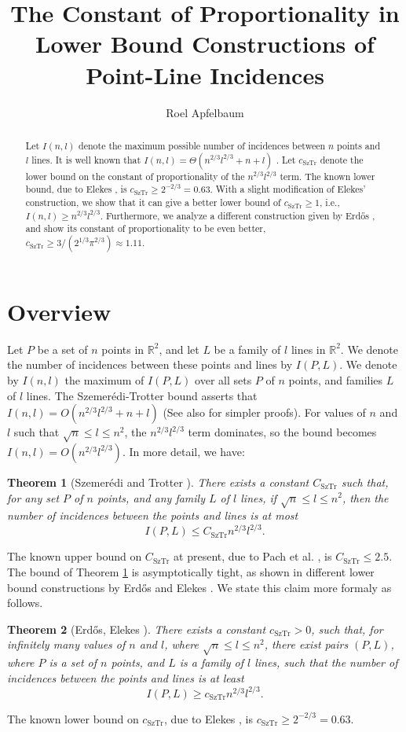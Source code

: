 \documentclass[11pt]{article}
\def\R{{\mathbb R}}
\newtheorem{theorem}{Theorem}[section]
\newcommand\erdos{{Erd{\H o}s}\xspace}
\newcommand\szemeredi{{Szemer\'edi}\xspace}
\newcommand\Cst{C_{\mathrm{SzTr}}}
\newcommand\cst{c_{\mathrm{SzTr}}}
\begin{document}
\title{The Constant of Proportionality in Lower Bound Constructions of
Point-Line Incidences}
\author{Roel Apfelbaum}

\maketitle

\begin{abstract}
Let $I(n,l)$ denote the maximum possible number of incidences between $n$ points
and $l$ lines.
It is well known that $I(n,l) = \Theta(n^{2/3}l^{2/3} + n + l)$
\cite{ST,Er-points-lines,El-sums}.
Let $\cst$ denote the lower bound on the constant of proportionality of the
$n^{2/3}l^{2/3}$ term.
The known lower bound, due to Elekes \cite{El-sums}, is
$\cst \ge 2^{-2/3} = 0.63$.
With a slight modification of Elekes' construction, we show that it can give a
better lower bound of $\cst \ge 1$, i.e., $I(n,l) \ge n^{2/3}l^{2/3}$.
Furthermore, we analyze a different construction given by \erdos
\cite{Er-points-lines}, and show its constant of proportionality to be even
better, $\cst \ge 3/(2^{1/3}\pi^{2/3}) \approx 1.11$.
\end{abstract}

\section{Overview}
Let $P$ be a set of $n$ points in $\R^2$, and let $L$ be a family of $l$ lines
in $\R^2$.
We denote the number of incidences between these points and lines by $I(P,L)$.
We denote by $I(n,l)$ the maximum of $I(P,L)$ over all sets $P$ of $n$ points,
and families $L$ of $l$ lines.
The \szemeredi-Trotter bound \cite{ST} asserts that
$I(n,l) = O(n^{2/3}l^{2/3} + n + l)$
(See also \cite{CEGSW, Sz} for simpler proofs).
For values of $n$ and $l$ such that $\sqrt{n} \le l \le n^2$, the
$n^{2/3}l^{2/3}$ term dominates, so the bound becomes
$I(n,l) = O(n^{2/3}l^{2/3})$.
In more detail, we have:
\begin{theorem}[\szemeredi and Trotter \cite{ST}] \label{thm:st}
There exists a constant $\Cst$ such that, for any set $P$ of $n$ points, and any
family $L$ of $l$ lines, if $\sqrt{n} \le l \le n^2$, then the number of
incidences between the points and lines is at most
\[
I(P,L) \le \Cst n^{2/3} l^{2/3}.
\]
\end{theorem}
\noindent
The known upper bound on $\Cst$ at present, due to Pach et al. \cite{PRTT}, is
$\Cst \le 2.5$.
The bound of Theorem \ref{thm:st} is asymptotically tight, as shown in different
lower bound constructions by \erdos \cite{Er-points-lines} and Elekes
\cite{El-sums}.
We state this claim more formaly as follows.
\begin{theorem}[\erdos \cite{Er-points-lines}, Elekes \cite{El-sums}]
\label{thm:low}
There exists a constant $\cst > 0$, such that, for infinitely many values of $n$
and $l$, where $\sqrt{n} \le l \le n^2$, there exist pairs $(P,L)$, where
$P$ is a set of $n$ points, and $L$ is a family of $l$ lines, such that the
number of incidences between the points and lines is at least
\[
I(P,L) \ge \cst n^{2/3} l^{2/3}.
\]
\end{theorem}
\noindent
The known lower bound on $\cst$, due to Elekes \cite{El-sums}, is
$\cst \ge 2^{-2/3} = 0.63$.
\end{document}
